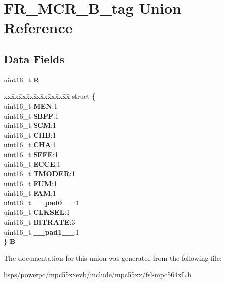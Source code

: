 \hypertarget{unionFR__MCR__16B__tag}{}\section{F\+R\+\_\+\+M\+C\+R\+\_\+B\+\_\+tag Union Reference}
\label{unionFR__MCR__16B__tag}
\subsection*{Data Fields}
\begin{DoxyCompactItemize}
\item 
\mbox{\label{unionFR__MCR__16B__tag_aa614f59806ccd5086a2cd2baf088b959}} 
uint16\+\_\+t {\bfseries R}
\item 
\mbox{\label{unionFR__MCR__16B__tag_ad2495d3a86311144008a5e84c95c7876}} 
\begin{tabbing}
xx\=xx\=xx\=xx\=xx\=xx\=xx\=xx\=xx\=\kill
struct \{\\
\>uint16\_t {\bfseries MEN}:1\\
\>uint16\_t {\bfseries SBFF}:1\\
\>uint16\_t {\bfseries SCM}:1\\
\>uint16\_t {\bfseries CHB}:1\\
\>uint16\_t {\bfseries CHA}:1\\
\>uint16\_t {\bfseries SFFE}:1\\
\>uint16\_t {\bfseries ECCE}:1\\
\>uint16\_t {\bfseries TMODER}:1\\
\>uint16\_t {\bfseries FUM}:1\\
\>uint16\_t {\bfseries FAM}:1\\
\>uint16\_t {\bfseries \_\_pad0\_\_}:1\\
\>uint16\_t {\bfseries CLKSEL}:1\\
\>uint16\_t {\bfseries BITRATE}:3\\
\>uint16\_t {\bfseries \_\_pad1\_\_}:1\\
\} {\bfseries B}\\

\end{tabbing}\end{DoxyCompactItemize}


The documentation for this union was generated from the following file\+:\begin{DoxyCompactItemize}
\item 
bsps/powerpc/mpc55xxevb/include/mpc55xx/fsl-\/mpc564x\+L.\+h\end{DoxyCompactItemize}
